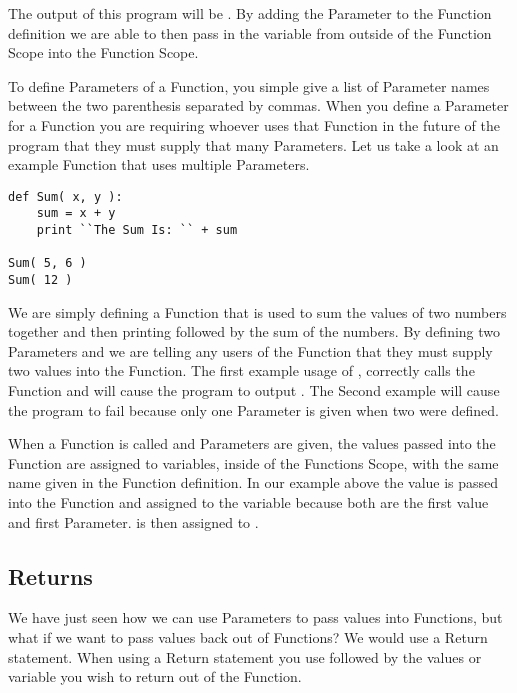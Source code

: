 The output of this program will be .
By adding the  Parameter to the  Function definition we are able to then pass in the
variable  from outside of the Function Scope into the Function Scope.
\par

To define Parameters of a Function, you simple give a list of Parameter names between the two parenthesis separated by commas.
When you define a Parameter for a Function you are requiring whoever uses that Function in the future of the program that they
must supply that many Parameters.
Let us take a look at an example Function that uses multiple Parameters.

\begin{lstlisting}[caption={Multiple Parameters Example}]
def Sum( x, y ):
    sum = x + y
    print ``The Sum Is: `` + sum

Sum( 5, 6 )
Sum( 12 )
\end{lstlisting}

We are simply defining a Function that is used to sum the values of two numbers together and then printing  followed by
the sum of the numbers.
By defining two Parameters  and  we are telling any users of the Function that they must supply two values into the Function.
The first example usage of ,  correctly calls the Function and will cause the program to output .
The Second example  will cause the program to fail because only one Parameter is given when two were defined.
\par

When a Function is called and Parameters are given, the values passed into the Function are assigned to variables, inside of the Functions Scope, with the 
same name given in the Function definition.
In our example above the value  is passed into the Function and assigned to the variable  because both are the first value and first 
Parameter.
 is then assigned to .

\subsection{Returns}
We have just seen how we can use Parameters to pass values into Functions, but what if we want to pass values back out of Functions?
We would use a Return statement.
When using a Return statement you use  followed by the values or variable you wish to return out of the Function.

